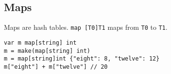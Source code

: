 \subsection{Maps}
Maps are hash tables. \texttt{map [T0]T1} maps from \texttt{T0} to
\texttt{T1}.
\begin{lstlisting}
var m map[string] int
m = make(map[string] int)
m = map[string]int {"eight": 8, "twelve": 12}
m["eight"] + m["twelve"] // 20
\end{lstlisting}

